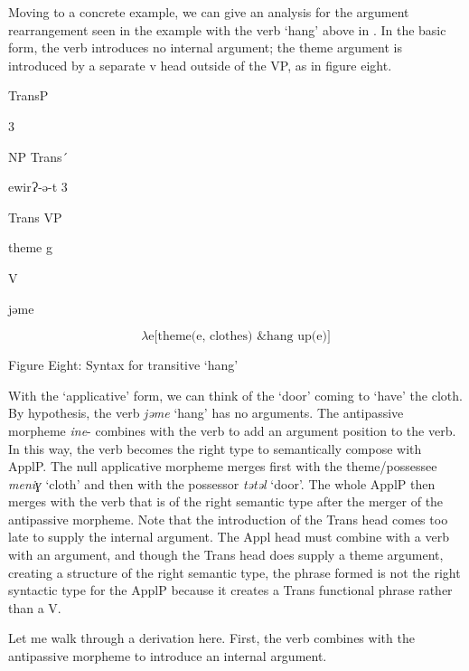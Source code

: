 \documentclass[output=paper,modfonts,nonflat]{langsci/langscibook}
\begin{document}
Moving to a concrete example, we can give an analysis for the argument rearrangement seen in the example with the verb ‘hang’ above in .  In the basic form, the verb introduces no internal argument; the theme argument is introduced by a separate v head outside of the VP, as in figure eight.

      TransP    

           3  

           NP        Trans´  

    ewirɁ-ǝ{}-t 3

         Trans      VP

         theme        g

                V

            jǝme

\begin{equation*}
\lambda \text{e[}\text{theme}\text{(e, clothes) \& hang}\text{ up}\text{(e)]}
\end{equation*}

\begin{stylecaption}
Figure Eight: Syntax for transitive ‘hang’
\end{stylecaption}

With the ‘applicative’ form, we can think of the ‘door’ coming to ‘have’ the cloth.  By hypothesis, the verb \textit{jǝme} ‘hang’ has no arguments. The antipassive morpheme \textit{ine}{}- combines with the verb to add an argument position to the verb.  In this way, the verb becomes the right type to semantically compose with ApplP.  The null applicative morpheme merges first with the theme/possessee \textit{meniɣ} ‘cloth’ and then with the possessor \textit{tǝtǝl} ‘door’.  The whole ApplP then merges with the verb that is of the right semantic type after the merger of the antipassive morpheme. Note that the introduction of the Trans head comes too late to supply the internal argument. The Appl head must combine with a verb with an argument, and though the Trans head does supply a theme argument, creating a structure of the right semantic type, the phrase formed is not the right syntactic type for the ApplP because it creates a Trans functional phrase rather than a V.

Let me walk through a derivation here.  First, the verb combines with the antipassive morpheme to introduce an internal argument.

\ea%
    \label{ex:key:7}
    \gll\\
        \\
    \glt
    \z
\end{document}
